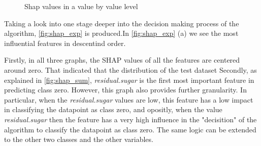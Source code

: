 \documentclass[11pt,twoside]{article}
\numberwithin{Theorem}{section}
\numberwithin{Definition}{section}
\numberwithin{Lemma}{section}
\numberwithin{Algorithm}{section}
\numberwithin{equation}{section}
\begin{document}
\begin{figure}[!h]
    \centering
    \caption{Shap values in a value by value level}
    \label{fig:shap_exp}
\end{figure}

Taking a look into one stage deeper into the decision making process of the algorithm, \autoref{fig:shap_exp} is produced.In \autoref{fig:shap_exp} (a) we see the most influential features in descentind order.

Firstly, in all three graphs, the SHAP values of all the features are centered around zero. That indicated that the distribution of the test dataset 
Secondly, as explained in \autoref{fig:shap_sum}, \textit{residual.sugar} is the first most important feature in predicting class zero. However, this graph also provides further granularity. In particular, when the \textit{residual.sugar} values are low, this feature has a low impact in classifying the datapoint as class zero, and opositly, when the value \textit{residual.sugar} then the feature has a very high influence in the "decisition" of the algorithm to classify the datapoint as class zero. The same logic can be extended to the other two classes and the other variables.
\end{document}
